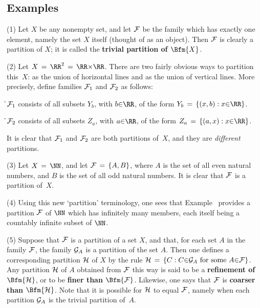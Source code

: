 {\V
\V

        \subsection{\small{{\bf Examples}}}
        \label{ExampA50.70}

\hspace*{\parindent}
        (1) Let $X$ be any nonempty set, and let ${\cal F}$ be the family which has exactly one element, namely the set $X$ itself (thought of as an object).
    Then ${\cal F}$ is clearly a partition of $X$; it is called the {\bf trivial partition of $\Bfm{X}$}.

\V

        (2) Let $X \,=\, {\RR}^{2} \,=\, {\RR}{\times}{\RR}$. There are two fairly obvious ways to partition this~$X$:
    as the union of horizontal lines and as the union of vertical lines. More precisely, define families ${\cal F}_{1}$ and ${\cal F}_{2}$ as follows:

        \h ${\cal F}_{1}$ consists of all subsets $Y_{b}$, with $b{\in}{\RR}$, of the form $Y_{b} \,=\, \{(x,b): x{\in}{\RR}\}$.

        \h ${\cal F}_{2}$ consists of all subsets $Z_{a}$, with $a{\in}{\RR}$, of the form $Z_{a} \,=\, \{(a,x): x{\in}{\RR}\}$.

\noindent It is clear that ${\cal F}_{1}$ and ${\cal F}_{2}$ are both partitions of~$X$, and they are {\em different} partitions.


\V

        (3) Let $X \,=\, {\NN}$, and let ${\cal F} \,=\, \{A,B\}$, where $A$ is the set of all even natural numbers,
    and $B$ is the set of all odd natural numbers. It is clear that ${\cal F}$ is a partition of~$X$.

\V

        (4) Using this new `partition' terminology, one sees that Example~
    provides a partition ${\cal F}$ of ${\NN}$ which has infinitely many members, each itself being a countably infinite subset of ${\NN}$.

\V

        (5) Suppose that ${\cal F}$ is a partition of a set $X$, and that, for each set $A$ in the family ${\cal F}$,
    the family ${\cal G}_{A}$ is a partition of the set $A$. Then one defines a corresponding partition ${\cal H}$ of $X$ by the rule
    ${\cal H} \,=\, \{C: C{\in}{\cal G}_{A} \mbox{ for some $A{\in}{\cal F}$}\}$.
    Any partition ${\cal H}$ of $A$ obtained from ${\cal F}$ this way is said to be a {\bf refinement of $\Bfm{{\cal H}}$},
    or to be {\bf finer than $\Bfm{{\cal F}}$}. Likewise, one says that ${\cal F}$ is {\bf coarser than $\Bfm{{\cal H}}$}.
    Note that it is possible for ${\cal H}$ to equal ${\cal F}$, namely when each partition ${\cal G}_{A}$ is the trivial partition of~$A$.

}
